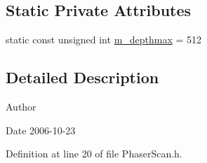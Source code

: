 \subsection*{Static Private Attributes}
\begin{DoxyCompactItemize}
\item 
static const unsigned int \hyperlink{classPhaserScan_a3c5a969d3fef57564d2632b256bf857e}{m\_\-depthmax} = 512
\end{DoxyCompactItemize}


\subsection{Detailed Description}
\begin{DoxyAuthor}{Author}

\end{DoxyAuthor}
\begin{DoxyDate}{Date}
2006-\/10-\/23 
\end{DoxyDate}


Definition at line 20 of file PhaserScan.h.

